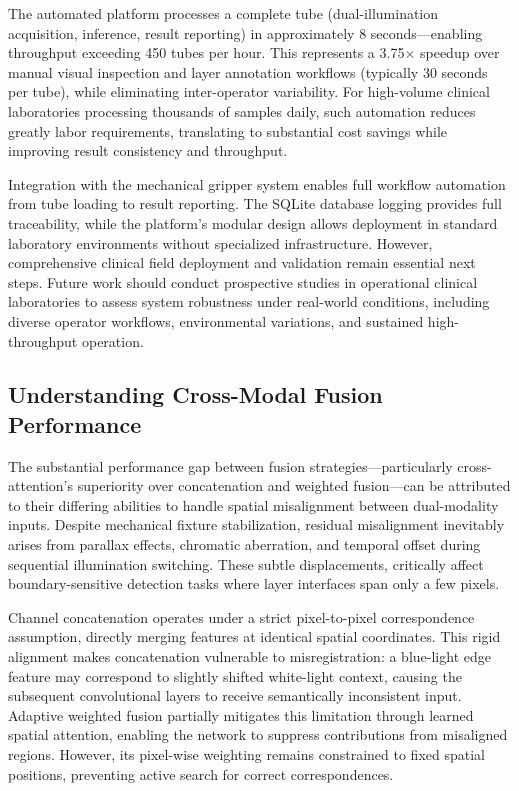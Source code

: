 \documentclass[journal,twoside,web]{ieeecolor}
\begin{document}
The automated platform processes a complete tube (dual-illumination acquisition, inference, result reporting) in approximately 8 seconds—enabling throughput exceeding 450 tubes per hour. This represents a 3.75$\times$ speedup over manual visual inspection and layer annotation workflows (typically 30 seconds per tube), while eliminating inter-operator variability. For high-volume clinical laboratories processing thousands of samples daily, such automation reduces greatly labor requirements, translating to substantial cost savings while improving result consistency and throughput.

Integration with the mechanical gripper system enables full workflow automation from tube loading to result reporting. The SQLite database logging provides full traceability, while the platform's modular design allows deployment in standard laboratory environments without specialized infrastructure. However, comprehensive clinical field deployment and validation remain essential next steps. Future work should conduct prospective studies in operational clinical laboratories to assess system robustness under real-world conditions, including diverse operator workflows, environmental variations, and sustained high-throughput operation.

\subsection{Understanding Cross-Modal Fusion Performance}

The substantial performance gap between fusion strategies—particularly cross-attention's superiority over concatenation and weighted fusion—can be attributed to their differing abilities to handle spatial misalignment between dual-modality inputs. Despite mechanical fixture stabilization, residual misalignment inevitably arises from parallax effects, chromatic aberration, and temporal offset during sequential illumination switching. These subtle displacements, critically affect boundary-sensitive detection tasks where layer interfaces span only a few pixels.

Channel concatenation operates under a strict pixel-to-pixel correspondence assumption, directly merging features at identical spatial coordinates. This rigid alignment makes concatenation vulnerable to misregistration: a blue-light edge feature may correspond to slightly shifted white-light context, causing the subsequent convolutional layers to receive semantically inconsistent input. Adaptive weighted fusion partially mitigates this limitation through learned spatial attention, enabling the network to suppress contributions from misaligned regions. However, its pixel-wise weighting remains constrained to fixed spatial positions, preventing active search for correct correspondences.
\end{document}
